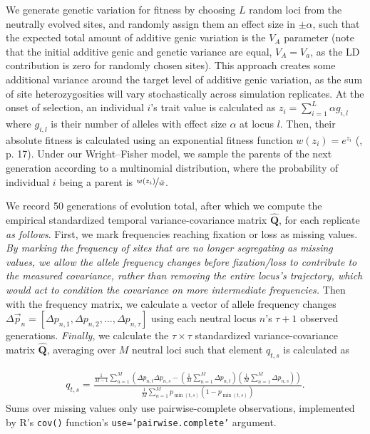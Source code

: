 \documentclass[11pt]{article}
\newcommand{\vb}[1]{{\it \color{blue} #1}}
\newcommand{\E}{\mathbb{E}}
\DeclareMathOperator{\cov}{Cov}
\begin{document}
We generate genetic variation for fitness by choosing $L$ random loci from the
neutrally evolved sites, and randomly assign them an effect size in $\pm
\alpha$, such that the expected total amount of additive genic variation is the
$V_A$ parameter (note that the initial additive genic and genetic variance are
equal, $V_A = V_a$, as the LD contribution is zero for randomly chosen sites).
This approach creates some additional variance around the target level of
additive genic variation, as the sum of site heterozygosities will vary
stochastically across simulation replicates. At the onset of selection, an
individual $i$'s trait value is calculated as $z_i = \sum_{i=1}^L \alpha
g_{i,l}$ where $g_{i,l}$ is their number of alleles with effect size $\alpha$
at locus $l$.  Then, their absolute fitness is calculated using an exponential
fitness function $w(z_i) = e^{z_i}$ (\cite{Turelli1990-kd}, p. 17). Under our
Wright--Fisher model, we sample the parents of the next generation according to
a multinomial distribution, where the probability of individual $i$ being a
parent is $\nicefrac{w(z_i)}{\bar{w}}$. 

We record 50 generations of evolution total, after which we compute the
empirical standardized temporal variance-covariance matrix
$\widehat{\mathbf{Q}}$, for each replicate \vb{as follows}. First, we mark
frequencies reaching fixation or loss as missing values. \vb{By marking the
  frequency of sites that are no longer segregating as missing values, we allow
  the allele frequency changes before fixation/loss to contribute to the
  measured covariance, rather than removing the entire locus's trajectory,
which would act to condition the covariance on more intermediate frequencies.}
Then with the frequency matrix, we calculate a vector of allele frequency
changes $\Delta \vec{p}_n = [\Delta p_{n,1}, \Delta p_{n,2}, \ldots, \Delta
p_{n,\tau}]$ using each neutral locus $n$'s $\tau+1$ observed generations.
\vb{Finally}, we calculate the $\tau \times \tau$ standardized
variance-covariance matrix $\widehat{\mathbf{Q}}$, averaging over $M$ neutral
loci such that element $q_{t,s}$ is calculated as

\begin{align}
  q_{t,s} = \frac{\frac{1}{M - 1} \sum_{n=1}^M \left( \Delta p_{n,t} \Delta p_{n,s} - \left(\frac{1}{M} \sum_{n=1}^M \Delta p_{n,t}\right) \left( \frac{1}{M} \sum_{n=1}^M \Delta p_{n,s} \right) \right)}{
  \frac{1}{M} \sum_{n=1}^M p_{\min(t,s)} \left(1 - p_{\min(t,s)}\right)
  }.
  \label{eq:ave-temp-autocov}
\end{align}
%
Sums over missing values only use pairwise-complete observations, implemented
by R's \texttt{cov()} function's \texttt{use='pairwise.complete'} argument.
\end{document}
